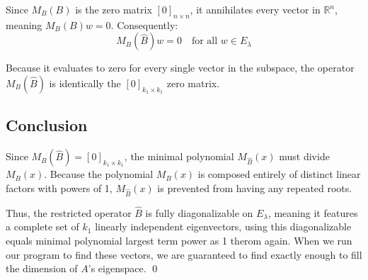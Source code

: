 \documentclass{article}
\begin{document}
Since $M_B(B)$ is the zero matrix $[0]_{n \times n}$, it annihilates every vector in $\mathbb{R}^n$, meaning $M_B(B)w = 0$. Consequently:
\[ M_B(\hat{B})w = 0 \quad \text{for all } w \in E_\lambda \]

Because it evaluates to zero for every single vector in the subspace, the operator $M_B(\hat{B})$ is identically the $[0]_{k_1 \times k_1}$ zero matrix.

\subsection{Conclusion}
Since $M_B(\hat{B}) = [0]_{k_1 \times k_1}$, the minimal polynomial $M_{\hat{B}}(x)$ must divide $M_B(x)$. Because the polynomial $M_B(x)$ is composed entirely of distinct linear factors with powers of 1, $M_{\hat{B}}(x)$ is prevented from having any repeated roots.

Thus, the restricted operator $\hat{B}$ is fully diagonalizable on $E_\lambda$, meaning it features a complete set of $k_1$ linearly independent eigenvectors, using this diagonalizable equals minimal polynomial largest term power as 1 therom again. When we run our program to find these vectors, we are guaranteed to find exactly enough to fill the dimension of $A$'s eigenspace. \qed
\end{document}
